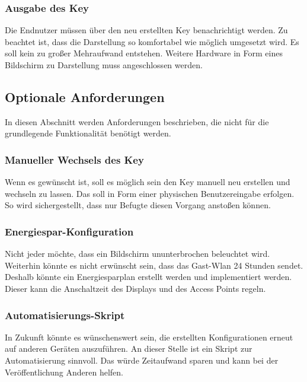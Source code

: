\documentclass[a4paper,11pt,singlespacing]{article}
\begin{document}
    			\subsubsection{Ausgabe des Key}
		            Die Endnutzer müssen über den neu erstellten Key benachrichtigt werden. Zu beachtet ist, dass die Darstellung so komfortabel wie möglich umgesetzt wird. Es soll kein zu großer Mehraufwand entstehen. Weitere Hardware in Form eines Bildschirm zu Darstellung muss angeschlossen werden.
		            
			\subsection{Optionale Anforderungen}
			    In diesen Abschnitt werden Anforderungen beschrieben, die nicht für die grundlegende Funktionalität benötigt werden.
                \subsubsection{Manueller Wechsels des Key}
                    Wenn es gewünscht ist, soll es möglich sein den Key manuell neu erstellen und wechseln zu lassen. Das soll in Form einer physischen Benutzereingabe erfolgen. So wird sichergestellt, dass nur Befugte diesen Vorgang anstoßen können. 
                \subsubsection{Energiespar-Konfiguration}
                    Nicht jeder möchte, dass ein Bildschirm ununterbrochen beleuchtet wird. Weiterhin könnte es nicht erwünscht sein, dass das Gast-Wlan 24 Stunden sendet. Deshalb könnte ein Energiesparplan erstellt werden und implementiert werden. Dieser kann die Anschaltzeit des Displays und des Access Points regeln. 
                \subsubsection{Automatisierungs-Skript}
                    In Zukunft könnte es wünschenswert sein, die erstellten Konfigurationen erneut auf anderen Geräten auszuführen. An dieser Stelle ist ein Skript zur Automatisierung sinnvoll. Das würde Zeitaufwand sparen und kann bei der Veröffentlichung Anderen helfen.  
\end{document}
